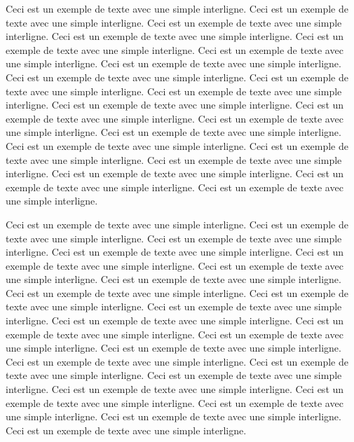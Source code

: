 \documentclass[12pt]{report}
\begin{document}
Ceci est un exemple de texte avec une simple interligne. 
Ceci est un exemple de texte avec une simple interligne. 
Ceci est un exemple de texte avec une simple interligne. 
Ceci est un exemple de texte avec une simple interligne. 
Ceci est un exemple de texte avec une simple interligne. 
Ceci est un exemple de texte avec une simple interligne. 
Ceci est un exemple de texte avec une simple interligne. 
Ceci est un exemple de texte avec une simple interligne. 
Ceci est un exemple de texte avec une simple interligne. 
Ceci est un exemple de texte avec une simple interligne. 
Ceci est un exemple de texte avec une simple interligne. 
Ceci est un exemple de texte avec une simple interligne. 
Ceci est un exemple de texte avec une simple interligne. 
Ceci est un exemple de texte avec une simple interligne. 
Ceci est un exemple de texte avec une simple interligne. 
Ceci est un exemple de texte avec une simple interligne. 
Ceci est un exemple de texte avec une simple interligne. 
Ceci est un exemple de texte avec une simple interligne. 
Ceci est un exemple de texte avec une simple interligne. 
Ceci est un exemple de texte avec une simple interligne. 

Ceci est un exemple de texte avec une simple interligne. 
Ceci est un exemple de texte avec une simple interligne. 
Ceci est un exemple de texte avec une simple interligne. 
Ceci est un exemple de texte avec une simple interligne. 
Ceci est un exemple de texte avec une simple interligne. 
Ceci est un exemple de texte avec une simple interligne. 
Ceci est un exemple de texte avec une simple interligne. 
Ceci est un exemple de texte avec une simple interligne. 
Ceci est un exemple de texte avec une simple interligne. 
Ceci est un exemple de texte avec une simple interligne. 
Ceci est un exemple de texte avec une simple interligne. 
Ceci est un exemple de texte avec une simple interligne. 
Ceci est un exemple de texte avec une simple interligne. 
Ceci est un exemple de texte avec une simple interligne. 
Ceci est un exemple de texte avec une simple interligne. 
Ceci est un exemple de texte avec une simple interligne. 
Ceci est un exemple de texte avec une simple interligne. 
Ceci est un exemple de texte avec une simple interligne. 
Ceci est un exemple de texte avec une simple interligne. 
Ceci est un exemple de texte avec une simple interligne. 
Ceci est un exemple de texte avec une simple interligne. 
Ceci est un exemple de texte avec une simple interligne.

\onehalfspacing
\end{document}
